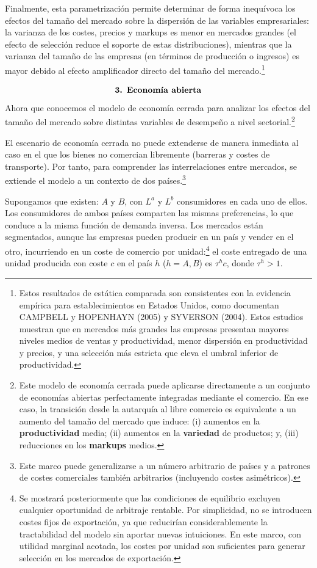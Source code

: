 \documentclass[10pt,a4paper]{article}
\begin{document}
Finalmente, esta parametrización permite determinar de forma inequívoca los efectos del tamaño del mercado sobre la dispersión de las variables empresariales: la varianza de los costes, precios y markups es menor en mercados grandes (el efecto de selección reduce el soporte de estas distribuciones), mientras que la varianza del tamaño de las empresas (en términos de producción o ingresos) es mayor debido al efecto amplificador directo del tamaño del mercado.\footnote{%
    Estos resultados de estática comparada son consistentes con la evidencia empírica para establecimientos en Estados Unidos, como documentan CAMPBELL y HOPENHAYN (2005) y SYVERSON (2004). Estos estudios muestran que en mercados más grandes las empresas presentan mayores niveles medios de ventas y productividad, menor dispersión en productividad y precios, y una selección más estricta que eleva el umbral inferior de productividad.
}


$$\text{\textbf{3. Economía abierta}}$$
Ahora que conocemos el modelo de economía cerrada para analizar los efectos del tamaño del mercado sobre distintas variables de desempeño a nivel sectorial.\footnote{%
    Este modelo de economía cerrada puede aplicarse directamente a un conjunto de economías abiertas perfectamente integradas mediante el comercio. En ese caso, la transición desde la autarquía al libre comercio es equivalente a un aumento del tamaño del mercado que induce: (i) aumentos en la \textbf{productividad} media; (ii) aumentos en la \textbf{variedad} de productos; y, (iii) reducciones en los \textbf{markups} medios.
}

El escenario de economía cerrada no puede extenderse de manera inmediata al caso en el que los bienes no comercian libremente (barreras y costes de transporte). Por tanto, para comprender las interrelaciones entre mercados, se extiende el modelo a un contexto de dos países.\footnote{%
    Este marco puede generalizarse a un número arbitrario de países y a patrones de costes comerciales también arbitrarios (incluyendo costes asimétricos).
}

Supongamos que existen: $A$ y $B$, con $L^a$ y $L^b$ consumidores en cada uno de ellos. Los consumidores de ambos países comparten las mismas preferencias, lo que conduce a la misma función de demanda inversa. Los mercados están segmentados, aunque las empresas pueden producir en un país y vender en el otro, incurriendo en un coste de comercio por unidad:\footnote{%
    Se mostrará posteriormente que las condiciones de equilibrio excluyen cualquier oportunidad de arbitraje rentable. Por simplicidad, no se introducen costes fijos de exportación, ya que reducirían considerablemente la tractabilidad del modelo sin aportar nuevas intuiciones. En este marco, con utilidad marginal acotada, los costes por unidad son suficientes para generar selección en los mercados de exportación.
} el coste entregado de una unidad producida con coste $c$ en el país $h$ ($h = A, B$) es $\tau^h c$, donde $\tau^h > 1$. 
\end{document}
